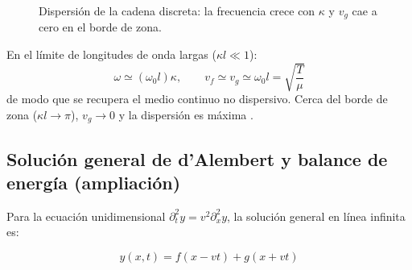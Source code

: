 \documentclass[12pt, a4paper]{article}
\theoremstyle{plain}
\theoremstyle{definition}
\theoremstyle{remark}
\begin{document}
\begin{figure}[H]
  \centering
  \caption{Dispersión de la cadena discreta: la frecuencia crece con $\kappa$ y $v_g$ cae a cero en el borde de zona.}
\end{figure}

En el límite de longitudes de onda largas ($\kappa l\ll 1$):
\begin{equation}
  \omega \simeq (\omega_0 l)\kappa,\qquad
  v_f \simeq v_g \simeq \omega_0 l = \sqrt{\frac{T}{\mu}}
\end{equation}
de modo que se recupera el medio continuo no dispersivo. Cerca del borde de zona
($\kappa l\to\pi$), $v_g\to 0$ y la dispersión es máxima \cite{mit803_ch6}.

\subsection{Solución general de d'Alembert y balance de energía (ampliación)}

Para la ecuación unidimensional $\partial_t^2 y=v^2\partial_x^2 y$, la solución general en
línea infinita es:
\begin{mdframed}[style=resultado]
\begin{equation}
  y(x,t)=f(x-vt)+g(x+vt)
\end{equation}
\end{mdframed}
\end{document}
